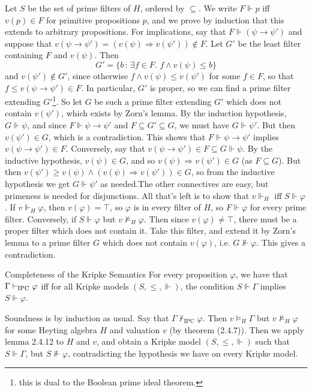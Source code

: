 \documentclass{article}
\numberwithin{thm}{subsection}
\begin{document}
\proof Let $S$ be the set of prime filters of $H$, ordered by $\subseteq$. We write $F \Vdash p$ iff $v(p) \in F$ for primitive propositions $p$, and we prove by induction that this extends to arbitrary propositions. \gap 
For implications, say that $F \Vdash (\psi \rightarrow \psi')$ and suppose that $v(\psi \rightarrow \psi') = (v(\psi) \Rightarrow v(\psi')) \notin F$. Let $G'$ be the least filter containing $F$ and $v(\psi)$. Then \[ G' = \{ b  \, : \, \exists f \in F.\,\, f \wedge v(\psi) \leq b \} \] and $v(\psi') \notin G'$, since otherwise $f \wedge v(\psi) \leq v(\psi')$ for some $f \in F$, so that $f \leq v(\psi \rightarrow \psi') \in F$. In particular, $G'$ is proper, so we can find a prime filter extending $G'$\footnote{this is dual to the Boolean prime ideal theorem.}. So let $G$ be such a prime filter extending $G'$ which does not contain $v(\psi')$, which exists by Zorn's lemma. \gap 
By the induction hypothesis, $G \Vdash \psi$, and since $F \Vdash \psi \rightarrow \psi'$ and $F \subseteq G' \subseteq G$, we must have $G \Vdash \psi'$. But then $v(\psi') \in G$, which is a contradiction. This shows that $F \Vdash \psi \rightarrow \psi'$ implies $v(\psi \rightarrow \psi') \in F$. \gap 
Conversely, say that $v(\psi \rightarrow \psi') \in F \subseteq G \Vdash \psi$. By the inductive hypothesis, $v(\psi) \in G$, and so $v(\psi) \Rightarrow v(\psi') \in G$ (as $F \subseteq G$). But then $v(\psi') \geq v(\psi) \wedge (v(\psi) \Rightarrow v(\psi')) \in G$, so from the inductive hypothesis we get $G \Vdash \psi'$ as needed.\gap The other connectives are easy, but primeness is needed for disjunctions. All that's left is to show that $v \Vdash_{H}$ iff $S \Vdash \varphi$. \gap 
If $v \Vdash_{H} \varphi$, then $v(\varphi)= \top$, so $\varphi$ is in every filter of $H$, so $F \Vdash \varphi$ for every prime filter. \gap 
Conversely, if $S \Vdash \varphi$ but $v \nvDash_{H} \varphi$. Then since $v(\varphi) \neq \top$, there must be a proper filter which does not contain it. Take this filter, and extend it by Zorn's lemma to a prime filter $G$ which does not contain $v(\varphi)$, i.e. $G \nVdash \varphi$. This gives a contradiction. \endproof
\begin{fancythm}{Completeness of the Kripke Semantics}
    For every proposition $\varphi$, we have that $\Gamma \vdash_{\text{IPC}} \varphi$ iff for all Kripke models $(S, \leq, \Vdash)$, the condition $S \Vdash \Gamma$ implies $S \Vdash \varphi$.
\end{fancythm}
\proof
Soundness is by induction as usual. \gap 
Say that $\Gamma \nvdash_{\text{IPC}} \varphi$. Then $v \vDash_{H} \Gamma$ but $v \nvDash_{H}\varphi$ for some Heyting algebra $H$ and valuation $v$ (by theorem (2.4.7)). Then we apply lemma 2.4.12 to $H$ and $v$, and obtain a Kripke model $(S, \leq, \Vdash)$ such that $S \Vdash \Gamma$, but $S \nVdash \varphi$, contradicting the hypothesis we have on every Kripke model.
\endproof
\end{document}
